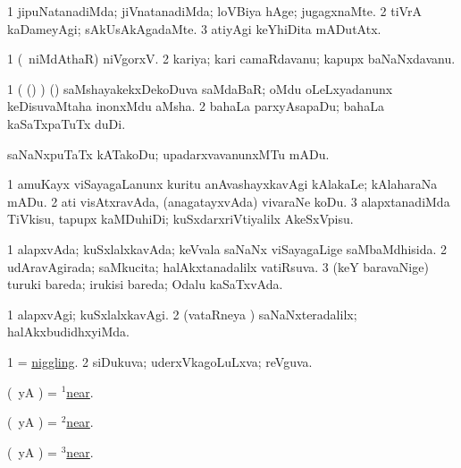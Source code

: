 \bentry
{}
\gl{\kirxvi}
\bmng
\bnum
\num{1} jipuNatanadiMda; jiVnatanadiMda; loVBiya hAge; jugagxnaMte. 
\num{2} tiVrA kaDameyAgi; sAkUsAkAgadaMte. 
\num{3} atiyAgi keYhiDita mADutAtx. 
\enum
\emng
\eentry

\bentry
{}
\gl{\nA}
\bmng
\bnum
\num{1} (\sA\ niMdAthaR) niVgorxV. 
\num{2} kariya; kari camaRdavanu; kapupx baNaNxdavanu. 
\enum
\emng

\noindent
\gl{\pagu}
\bmng
{} 
\bnum
\num{1}  ( (\ame) ) (\ashi) saMshayakekxDekoDuva saMdaBaR; oMdu oLeLxyadanunx keDisuvaMtaha inonxMdu aMsha. 
\num{2}  bahaLa parxyAsapaDu; bahaLa kaSaTxpaTuTx duDi. 
\enum
\emng
\eentry

\bentry
{}
\gl{\sakirx}
\bmng
saNaNxpuTaTx kATakoDu; upadarxvavanunxMTu mADu. 
\emng

\noindent
\gl{\akirx}
\bmng
\bnum
\num{1} amuKayx viSayagaLanunx kuritu anAvashayxkavAgi kAlakaLe; kAlaharaNa mADu. 
\num{2} ati visAtxravAda, (anagatayxvAda) vivaraNe koDu. 
\num{3} alapxtanadiMda TiVkisu, tapupx kaMDuhiDi; kuSxdarxriVtiyalilx AkeSxVpisu. 
\enum
\emng
\eentry

\bentry
{}
\gl{\gu}
\bmng
\bnum
\num{1} alapxvAda; kuSxlalxkavAda; keVvala saNaNx viSayagaLige saMbaMdhisida. 
\num{2} udAravAgirada; saMkucita; halAkxtanadalilx vatiRsuva. 
\num{3} (keY baravaNige) turuki bareda; irukisi bareda; Odalu kaSaTxvAda. 
\enum
\emng
\eentry

\bentry
{}
\gl{\kirxvi}
\bmng
\bnum
\num{1} alapxvAgi; kuSxlalxkavAgi. 
\num{2} (vataRneya \vi) saNaNxteradalilx; halAkxbudidhxyiMda. 
\enum
\emng
\eentry

\bentry
{}
\gl{\gu}
\bmng
\bnum
\num{1} = \hyperlink{niggling}{niggling}. 
\num{2} siDukuva; uderxVkagoLuLxva; reVguva. 
\enum
\emng
\eentry

\bentry
{}
\gl{\kirxvi}
\bmng
(\pArxparx\ yA \pArxM) = \hyperlink{near(1)}{$^1$near}. 
\emng
\eentry

\bentry
{}
\gl{\upa}
\bmng
(\pArxparx\ yA \pArxM) = \hyperlink{near(2)}{$^2$near}.
\emng
\eentry

\bentry
{}
\gl{\gu}
\bmng
(\pArxparx\ yA \pArxM) = \hyperlink{near(3)}{$^3$near}.
\emng
\eentry

